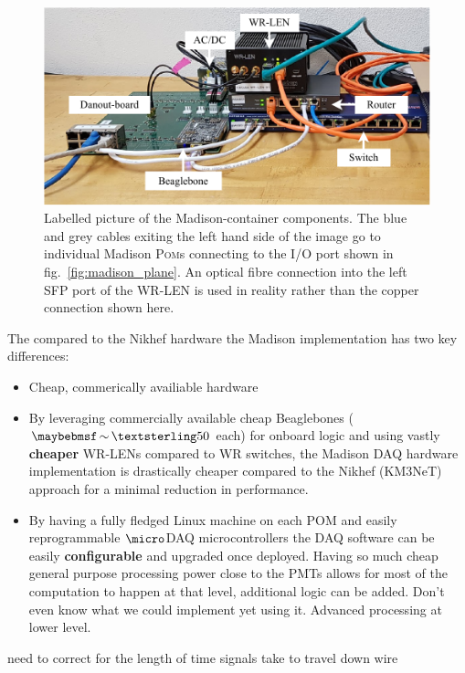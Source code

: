 \begin{figure} %
    \includegraphics[width=\textwidth]{diagrams/5-daq/madison_box.pdf}
    \caption[Labelled picture of the Madison-container components]
    {Labelled picture of the Madison-container components. The blue and grey cables exiting the
        left hand side of the image go to individual Madison \textsc{Pom}s connecting to the I/O
        port shown in fig.~\ref{fig:madison_plane}. An optical fibre connection into the left SFP
        port of the WR-LEN is used in reality rather than the copper connection shown here.}
    \label{fig:madison_box}
\end{figure}

The compared to the Nikhef hardware the Madison implementation has two key differences:
\begin{itemize}
    \item Cheap, commerically availiable hardware 
    \item By leveraging commercially available cheap Beaglebones ($\sim\textsterling50$ each) for
    onboard logic and using vastly \textbf{cheaper} WR-LENs compared to WR switches, the Madison
    DAQ hardware implementation is drastically cheaper compared to the Nikhef (KM3NeT) approach
    for a minimal reduction in performance.
    \item By having a fully fledged Linux machine on each POM and easily reprogrammable
    $\micro$DAQ microcontrollers the DAQ software can be easily \textbf{configurable} and upgraded
    once deployed. Having so much cheap general purpose processing power close to the PMTs allows
    for most of the computation to happen at that level, additional logic can be added. Don't even
    know what we could implement yet using it. Advanced processing at lower level. 
\end{itemize}

need to correct for the length of time signals take to travel down wire

